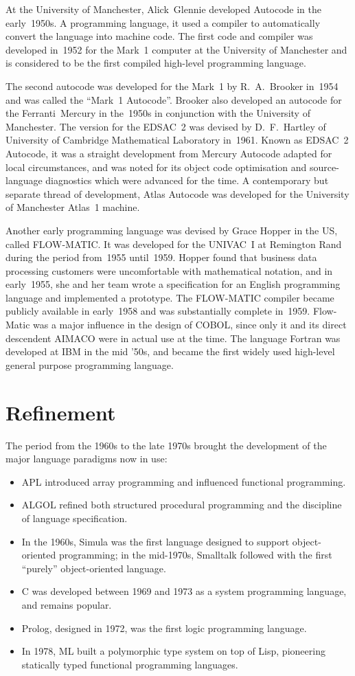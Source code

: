 At the University of Manchester, Alick~Glennie developed Autocode in the
early~1950s. A programming language, it used a compiler to automatically
convert the language into machine code. The first code and compiler was
developed in~1952 for the Mark~1 computer at the University of Manchester
and is considered to be the first compiled high-level programming language.

The second autocode was developed for the Mark~1 by R.~A.~Brooker in~1954 and
was called the ``Mark~1 Autocode''. Brooker also developed an autocode for the
Ferranti~Mercury in the~1950s in conjunction with the University of Manchester.
The version for the EDSAC~2 was devised by D.~F.~Hartley of University of
Cambridge Mathematical Laboratory in~1961. Known as EDSAC~2 Autocode, it was a
straight development from Mercury Autocode adapted for local circumstances, and
was noted for its object code optimisation and source-language diagnostics
which were advanced for the time. A contemporary but separate thread of
develop\-ment, Atlas Autocode was developed for the University of Manchester
Atlas~1 machine.

Another early programming language was devised by Grace Hopper in the US,
called FLOW-MATIC. It was developed for the UNIVAC~I at Remington Rand during
the period from~1955 until~1959. Hopper found that business data processing
customers were uncomfortable with mathematical notation, and in early~1955,
she and her team wrote a specification for an English programming language
and implemented a prototype. The FLOW-MATIC compiler became pub\-licly available
in early~1958 and was substantially complete in~1959. Flow-Matic was a major
influence in the design of COBOL, since only it and its direct descendent AIMACO
were in actual use at the time. The language Fortran was developed at IBM
in the mid ’50s, and became the first widely used high-level general purpose
programming language.

\section{Refinement}
The period from the 1960s to the late 1970s brought the development of the
major language paradigms now in use:
\begin{itemize}
  \item APL introduced array programming and influenced functional
    programming.
  \item ALGOL refined both structured procedural programming and the
    discipline of language specification.
  \item In the 1960s, Simula was the first language designed to support
    object-oriented programming; in the mid-1970s, Smalltalk followed with the
    first ``purely'' object-oriented language.
  \item C was developed between 1969 and 1973 as a system programming
    language, and remains popular.
  \item Prolog, designed in 1972, was the first logic programming language.
  \item In 1978, ML built a polymorphic type system on top of Lisp,
    pioneering statically typed functional programming languages.
\end{itemize}

